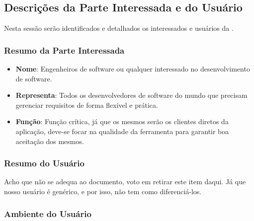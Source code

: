 \subsection{Descrições da Parte Interessada e do Usuário}

Nesta sessão serão identificados e detalhados os interessados e usuários da \nomeferramenta{}.

\subsubsection{Resumo da Parte Interessada}

\begin{itemize}
	\item \textbf{Nome}:
		Engenheiros de software ou qualquer interessado no desenvolvimento de software.
	\item \textbf{Representa}:
		Todos os desenvolvedores de software do mundo que precisam gerenciar requisitos de forma flexivel e prática.
	\item \textbf{Função}:
		Função crítica, já que os mesmos serão os clientes diretos da aplicação, deve-se focar na qualidade da ferramenta para garantir boa aceitação dos mesmos.
\end{itemize}

\subsubsection{Resumo do Usuário}

	Acho que não se adequa ao documento, voto em retirar este item daqui. Já que nosso usuário é genérico, e por isso, não tem como diferenciá-los.

\subsubsection{Ambiente do Usuário} 
	
